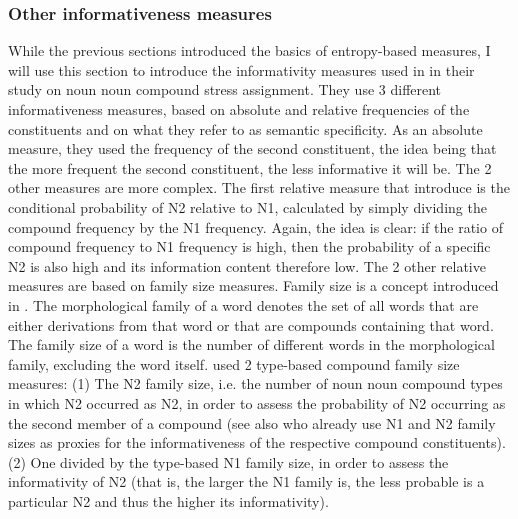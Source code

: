 \subsubsection{Other informativeness measures}
\label{sec:other-informativeness}

While the previous sections introduced the basics of entropy-based
measures, I will use this section to introduce the informativity
measures used in
\citet{BellandPlag:2012} in their study on noun noun compound stress
assignment. They use 3
different informativeness measures, based on absolute and relative
frequencies of the constituents and on what they refer to as semantic
specificity. As an absolute measure, they used the frequency of the
second constituent, the idea being that the more frequent the second
constituent, the less informative it will be. 
The 2 other measures are more
complex.
The first relative measure that \citet[492]{BellandPlag:2012} introduce is the
conditional probability of N2 relative to N1, calculated by simply dividing
the compound frequency by the N1 frequency. Again, the idea is clear: if the ratio
of compound frequency to N1 frequency is high, then the probability of a specific N2 is also high and
its information content therefore low. The 2 other relative measures are
based on family size measures. %
Family size is a concept introduced in
\citet[121]{SchreuderandBaayen:1997}. 
The morphological family of a word denotes
the set of all words that are either derivations from that word or that are
compounds containing that word. The family size of a word is the number of
different words in the morphological family, excluding the word itself. %
\citet{BellandPlag:2012}
used 2 type-based compound family size measures: (1) The N2 family size, i.e. the number of noun noun compound types in which N2 occurred as N2,
in order to assess the probability of N2 occurring as the second member of a compound (see also \citealt{PlagandKunter:2010} who already use N1 and N2 family sizes as proxies for the  informativeness of the respective compound constituents). (2)
One divided by the type-based N1 family size, in order to assess the informativity of N2 (that is, the
larger the N1 family is, the less probable is a particular N2 and thus the higher
its informativity). 

